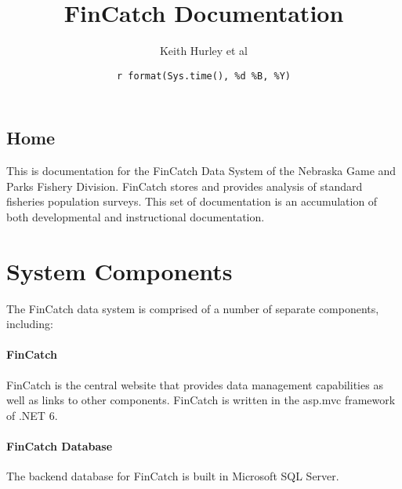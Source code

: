 \documentclass[
  letterpaper,
  DIV=11,
  numbers=noendperiod]{scrreprt}
\title{FinCatch Documentation}
\author{Keith Hurley et al}
\date{\texttt{r\ format(Sys.time(),\ \textquotesingle{}\%d\ \%B,\ \%Y\textquotesingle{})}}
\renewcommand*\contentsname{Table of contents}
\newcommand\contentsname{Table of contents}
\begin{document}
\maketitle
\ifdefined\Shaded\renewenvironment{Shaded}{\begin{tcolorbox}[breakable, boxrule=0pt, sharp corners, enhanced, borderline west={3pt}{0pt}{shadecolor}, frame hidden, interior hidden]}{\end{tcolorbox}}\fi

\renewcommand*\contentsname{Table of contents}
{
\hypersetup{linkcolor=}
\setcounter{tocdepth}{2}
\tableofcontents
}

\hypertarget{Home}{%
\chapter*{Home}\label{Home}}

This is documentation for the FinCatch Data System of the Nebraska Game
and Parks Fishery Division. FinCatch stores and provides analysis of
standard fisheries population surveys. This set of documentation is an
accumulation of both developmental and instructional documentation.

\part{System Components}

The FinCatch data system is comprised of a number of separate
components, including:

\hypertarget{fincatch}{%
\subsection*{FinCatch}\label{fincatch}}

FinCatch is the central website that provides data management
capabilities as well as links to other components. FinCatch is written
in the asp.mvc framework of .NET 6.

\hypertarget{fincatch-database}{%
\subsection*{FinCatch Database}\label{fincatch-database}}

The backend database for FinCatch is built in Microsoft SQL Server.
\end{document}
